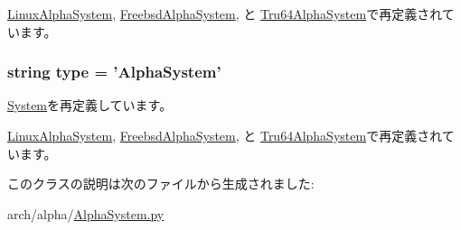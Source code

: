 \hyperlink{classAlphaSystem_1_1LinuxAlphaSystem_acfe3506cfe10e05a2cb2c2973dc5dad2}{LinuxAlphaSystem}, \hyperlink{classAlphaSystem_1_1FreebsdAlphaSystem_acfe3506cfe10e05a2cb2c2973dc5dad2}{FreebsdAlphaSystem}, と \hyperlink{classAlphaSystem_1_1Tru64AlphaSystem_acfe3506cfe10e05a2cb2c2973dc5dad2}{Tru64AlphaSystem}で再定義されています。\hypertarget{classAlphaSystem_1_1AlphaSystem_acce15679d830831b0bbe8ebc2a60b2ca}{
\subsubsection[{type}]{\setlength{\rightskip}{0pt plus 5cm}string type = '{\bf AlphaSystem}'}}
\label{classAlphaSystem_1_1AlphaSystem_acce15679d830831b0bbe8ebc2a60b2ca}


\hyperlink{classSystem_1_1System_acce15679d830831b0bbe8ebc2a60b2ca}{System}を再定義しています。

\hyperlink{classAlphaSystem_1_1LinuxAlphaSystem_acce15679d830831b0bbe8ebc2a60b2ca}{LinuxAlphaSystem}, \hyperlink{classAlphaSystem_1_1FreebsdAlphaSystem_acce15679d830831b0bbe8ebc2a60b2ca}{FreebsdAlphaSystem}, と \hyperlink{classAlphaSystem_1_1Tru64AlphaSystem_acce15679d830831b0bbe8ebc2a60b2ca}{Tru64AlphaSystem}で再定義されています。

このクラスの説明は次のファイルから生成されました:\begin{DoxyCompactItemize}
\item 
arch/alpha/\hyperlink{AlphaSystem_8py}{AlphaSystem.py}\end{DoxyCompactItemize}
